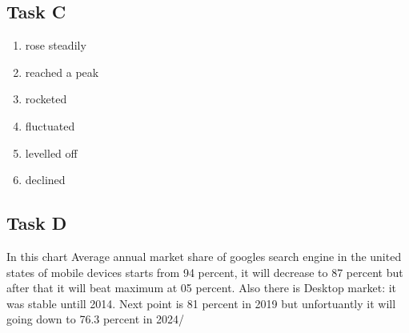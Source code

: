 \documentclass[a4paper,12pt,english]{article}
\begin{document}
\subsection{Task C}
\begin{enumerate}
    \item rose steadily
    \item reached a peak
    \item rocketed
    \item fluctuated
    \item levelled off
    \item declined
\end{enumerate}

\subsection{Task D}
In this chart Average annual market share of googles search engine in the united states of mobile devices starts from 94 percent, it will decrease to 87 percent but after that it will beat maximum at 05 percent. Also there is Desktop market: it was stable untill 2014. Next point is 81 percent in 2019 but unfortuantly it will going down to 76.3 percent in 2024/
\end{document}
